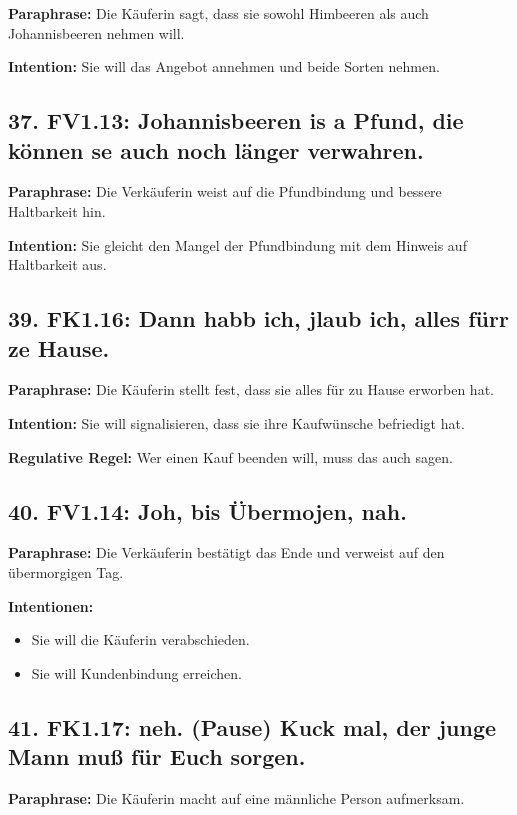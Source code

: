 \documentclass[11pt]{article}
\begin{document}
\textbf{Paraphrase:} Die Käuferin sagt, dass sie sowohl Himbeeren als auch Johannisbeeren nehmen will.

\textbf{Intention:} Sie will das Angebot annehmen und beide Sorten nehmen.

\subsection*{37. FV1.13: Johannisbeeren is a Pfund, die können se auch noch länger verwahren.}

\textbf{Paraphrase:} Die Verkäuferin weist auf die Pfundbindung und bessere Haltbarkeit hin.

\textbf{Intention:} Sie gleicht den Mangel der Pfundbindung mit dem Hinweis auf Haltbarkeit aus.

\subsection*{39. FK1.16: Dann habb ich, jlaub ich, alles fürr ze Hause.}

\textbf{Paraphrase:} Die Käuferin stellt fest, dass sie alles für zu Hause erworben hat.

\textbf{Intention:} Sie will signalisieren, dass sie ihre Kaufwünsche befriedigt hat.

\textbf{Regulative Regel:} Wer einen Kauf beenden will, muss das auch sagen.

\subsection*{40. FV1.14: Joh, bis Übermojen, nah.}

\textbf{Paraphrase:} Die Verkäuferin bestätigt das Ende und verweist auf den übermorgigen Tag.

\textbf{Intentionen:}
\begin{itemize}
    \item Sie will die Käuferin verabschieden.
    \item Sie will Kundenbindung erreichen.
\end{itemize}

\subsection*{41. FK1.17: neh. (Pause) Kuck mal, der junge Mann muß für Euch sorgen.}

\textbf{Paraphrase:} Die Käuferin macht auf eine männliche Person aufmerksam.
\end{document}
